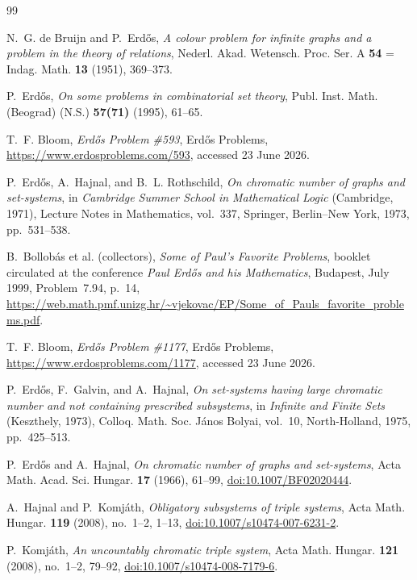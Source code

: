 \documentclass[11pt]{amsart}
\theoremstyle{definition}
\theoremstyle{remark}
\numberwithin{equation}{section}
\begin{document}
\begin{thebibliography}{99}

N.~G. de Bruijn and P.~Erd\H{o}s,
\emph{A colour problem for infinite graphs and a problem in the theory of relations},
Nederl. Akad. Wetensch. Proc. Ser. A \textbf{54} = Indag. Math. \textbf{13}
(1951), 369--373.

P.~Erd\H{o}s,
\emph{On some problems in combinatorial set theory},
Publ. Inst. Math. (Beograd) (N.S.) \textbf{57(71)} (1995), 61--65.

T.~F. Bloom,
\emph{Erd\H{o}s Problem \#593},
Erd\H{o}s Problems,
\url{https://www.erdosproblems.com/593},
accessed 23 June 2026.

P.~Erd\H{o}s, A.~Hajnal, and B.~L. Rothschild,
\emph{On chromatic number of graphs and set-systems},
in \emph{Cambridge Summer School in Mathematical Logic}
(Cambridge, 1971), Lecture Notes in Mathematics, vol.~337,
Springer, Berlin--New York, 1973, pp.~531--538.

B.~Bollob\'as et al. (collectors),
\emph{Some of Paul's Favorite Problems},
booklet circulated at the conference \emph{Paul Erd\H{o}s and his
Mathematics}, Budapest, July 1999, Problem~7.94, p.~14,
\url{https://web.math.pmf.unizg.hr/~vjekovac/EP/Some_of_Pauls_favorite_problems.pdf}.

T.~F. Bloom,
\emph{Erd\H{o}s Problem \#1177},
Erd\H{o}s Problems,
\url{https://www.erdosproblems.com/1177},
accessed 23 June 2026.

P.~Erd\H{o}s, F.~Galvin, and A.~Hajnal,
\emph{On set-systems having large chromatic number and not containing
prescribed subsystems},
in \emph{Infinite and Finite Sets} (Keszthely, 1973),
Colloq. Math. Soc. J\'anos Bolyai, vol.~10, North-Holland, 1975,
pp.~425--513.

P.~Erd\H{o}s and A.~Hajnal,
\emph{On chromatic number of graphs and set-systems},
Acta Math. Acad. Sci. Hungar. \textbf{17} (1966), 61--99,
\href{https://doi.org/10.1007/BF02020444}{doi:10.1007/BF02020444}.

A.~Hajnal and P.~Komj\'ath,
\emph{Obligatory subsystems of triple systems},
Acta Math. Hungar. \textbf{119} (2008), no.~1--2, 1--13,
\href{https://doi.org/10.1007/s10474-007-6231-2}{doi:10.1007/s10474-007-6231-2}.

P.~Komj\'ath,
\emph{An uncountably chromatic triple system},
Acta Math. Hungar. \textbf{121} (2008), no.~1--2, 79--92,
\href{https://doi.org/10.1007/s10474-008-7179-6}{doi:10.1007/s10474-008-7179-6}.


\end{thebibliography}
\end{document}
